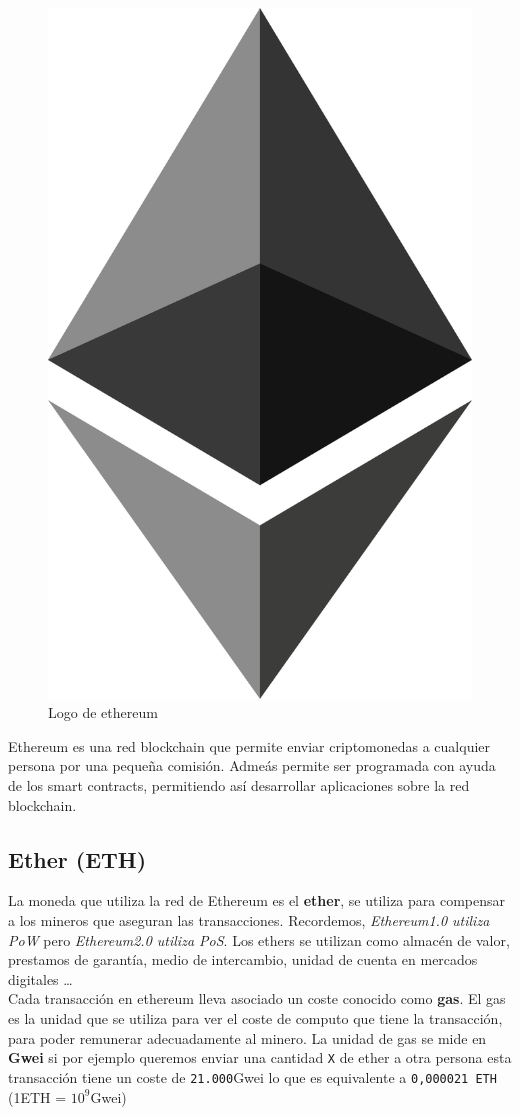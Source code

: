 \begin{figure}[h!]
  \centering
  \includegraphics[width=0.6\linewidth]{figs/EstadoArte/Ethereum/ethereumLOGO}
  \caption[Ethereum]{Logo de ethereum}
  \label{fig:ethereum}
\end{figure}

Ethereum es una red blockchain que permite enviar criptomonedas a cualquier persona por una pequeña comisión. Admeás permite ser programada con ayuda de los smart contracts, permitiendo así desarrollar aplicaciones sobre la red blockchain. \\

\subsection{Ether (ETH)}
La moneda que utiliza la red de Ethereum es el \textbf{ether}, se utiliza para compensar a los mineros que aseguran las transacciones. Recordemos, \emph{Ethereum1.0 utiliza PoW} pero \emph{Ethereum2.0 utiliza PoS}\cite{Ethereum2.0}. Los ethers se utilizan como almacén de valor, prestamos de garantía, medio de intercambio, unidad de cuenta en mercados digitales \dots \\

Cada transacción en ethereum lleva asociado un coste conocido como \textbf{gas}. El gas es la unidad que se utiliza para ver el coste de computo que tiene la transacción, para poder remunerar adecuadamente al minero. La unidad de gas se mide en \textbf{Gwei}\cite{Gwei} si por ejemplo queremos enviar una cantidad \verb|X| de ether a otra persona esta transacción tiene un coste de \verb|21.000|Gwei lo que es equivalente a \verb|0,000021 ETH| (1ETH = $10^9$Gwei)

